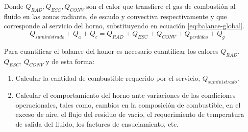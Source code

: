 \par Donde $Q_{RAD}, Q_{ESC}, Q_{CONV}$ son el calor que transfiere el gas de combustión al fluido en las zonas radiante, de escudo y convectiva respectivamente y que corresponde al servicio del horno, substituyendo en ecuación \ref{eq:balance-global}.
\begin{equation}
    Q_{suministrado} + Q_{a} + Q_{c} = Q_{RAD} + Q_{ESC} + Q_{CONV} + Q_{perdidas} + Q_{g}
\end{equation}
\par Para cuantificar el balance del honor es necesario cuantificar los calores $Q_{RAD}$, $Q_{ESC}$, $Q_{CONV}$ y de esta forma:
\begin{enumerate}
    \item Calcular la cantidad de combustible requerido por el servicio, $Q_{suministrado}$.
    \item Calcular el comportamiento del horno ante variaciones de las condiciones operacionales, tales como, cambios en la composición de combustible, en el exceso de aire, el flujo del residuo de vacío, el requerimiento de temperatura de salida del fluido, los factures de ensuciamiento, etc.
\end{enumerate}


